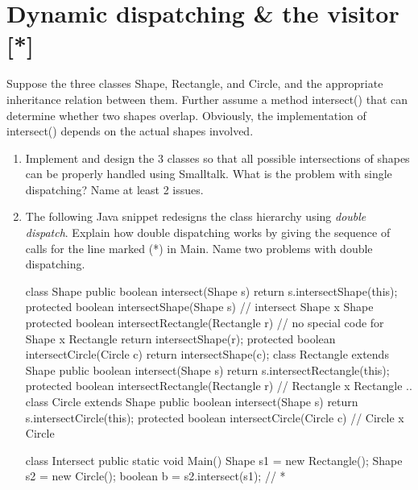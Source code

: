 \documentclass{article}
\begin{document}
\newpage
\section{Dynamic dispatching \& the visitor [*]}

Suppose the three classes \textsf{Shape}, \textsf{Rectangle}, and 
\textsf{Circle}, and the appropriate inheritance relation between them.
Further assume a method \textsf{intersect()} that can determine whether two
shapes overlap. Obviously, the implementation of \textsf{intersect()} 
depends on the actual shapes involved. 

\begin{enumerate}
\item Implement  and design  the 3 classes so that all possible
  intersections of shapes can be properly handled using Smalltalk.
  What is the problem with single dispatching? Name at least 2 issues.
\item The following Java snippet redesigns the
  class hierarchy using \textit{double dispatch}. 
  Explain how double dispatching works by
  giving the sequence of calls for the line marked (*) in \textsf{Main}.
  Name two problems with double dispatching.
  
\begin{java}
class Shape {
    public  boolean intersect(Shape s) {
         return s.intersectShape(this);
    }
    protected  boolean intersectShape(Shape s) {
        // intersect Shape x Shape
    }
    protected  boolean intersectRectangle(Rectangle r) {
        // no special code for Shape x Rectangle
        return intersectShape(r);
    }
    protected  boolean intersectCircle(Circle c) {
        return intersectShape(c);
   }
}
class Rectangle extends Shape {
    public  boolean intersect(Shape s) {
        return s.intersectRectangle(this);  
    }
    protected  boolean intersectRectangle(Rectangle r) {
        // Rectangle x Rectangle
        ..
    }
}
class Circle extends Shape {
    public  boolean intersect(Shape s) {
        return s.intersectCircle(this);  
    }
    protected  boolean intersectCircle(Circle c) {
        // Circle x Circle 
   }   
}

class Intersect {
   public static void Main() {
      Shape s1 = new Rectangle(); 
      Shape s2 = new Circle();
      boolean b = s2.intersect(s1);        // *
   }
}
\end{java}


\end{enumerate}
\end{document}
